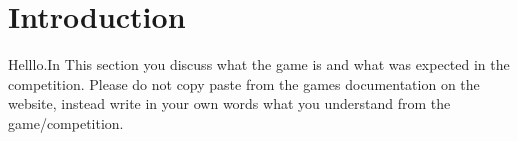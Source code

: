 \section{Introduction}



Helllo.In This section you discuss what the game is and what was expected in the competition. Please do not copy paste from the games documentation on the website, instead write in your own words what you understand from the game/competition.
